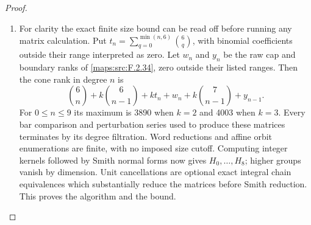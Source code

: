 \begin{proof}
\begin{enumerate}[label=\arabic*.]
\item For clarity the exact finite size bound can be read off
before running any matrix calculation.  Put
$t_n=\sum_{q=0}^{\min(n,6)}\binom6q$, with binomial
coefficients outside their range interpreted as zero.
Let $w_n$ and $y_n$ be the raw cap and boundary ranks of
\ref{maps:src:F.2.34}, zero outside their listed ranges.  Then the cone rank
in degree $n$ is
\[
 \binom6n+k\binom6{n-1}+k t_n+w_n+
 k\binom7{n-1}+y_{n-1}.                                 \tag{F.GC9}\label{maps:eq:F.GC9}
\]
For $0\leq n\leq9$ its maximum is 3890 when $k=2$ and
4003 when $k=3$.  Every bar comparison and perturbation
series used to produce these matrices terminates by its
degree filtration.  Word reductions and affine orbit
enumerations are finite, with no imposed size cutoff.
Computing integer kernels followed by Smith normal forms
now gives $H_0,\ldots,H_8$; higher groups vanish by dimension.
Unit cancellations are optional exact integral chain
equivalences which substantially reduce the matrices before
Smith reduction.  This proves the algorithm and the bound.
\end{enumerate}
\end{proof}



